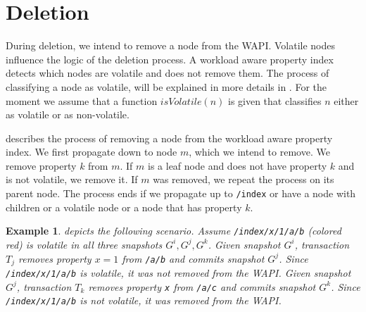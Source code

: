 \documentclass[abstracton,12pt]{scrreprt}
\newtheorem{example}{Example}
\begin{document}
\section{Deletion}

During deletion, we intend to remove a node from the WAPI.
Volatile nodes influence the logic of the deletion process.
A workload aware property index detects which nodes are volatile and does not remove them.
The process of classifying a node as volatile, will be explained in more details in .
For the moment we assume that a function $isVolatile(n)$ is given that classifies $n$ either as volatile or as non-volatile.

 describes the process of removing a node from the workload aware property index.
We first propagate down to node $m$, which we intend to remove.
We remove property $k$ from $m$.
If $m$ is a leaf node and does not have property $k$ and is not volatile, we remove it.
If $m$ was removed, we repeat the process on its parent node.
The process ends if we propagate up to \texttt{/index} or have a node with children or a volatile node or a node that has property $k$.

\begin{example}
     depicts the following scenario.
    Assume \texttt{/index/x/1/a/b} (colored red) is volatile in all three snapshots $G^i, G^j, G^k$.
    Given snapshot $G^i$, transaction $T_j$ removes property $x=1$ from \texttt{/a/b} and commits snapshot $G^j$.
    Since \texttt{/index/x/1/a/b} is volatile, it was not removed from the WAPI.
    Given snapshot $G^j$, transaction $T_k$ removes property \texttt{x} from \texttt{/a/c} and commits snapshot $G^k$.
    Since \texttt{/index/x/1/a/b} is not volatile, it was removed from the WAPI.
\end{example}
\end{document}
